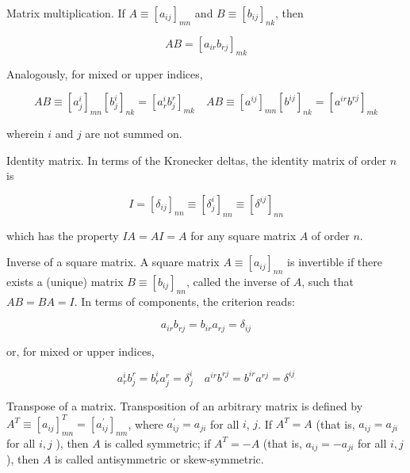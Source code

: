 \documentclass[10pt]{article}
\begin{document}
Matrix multiplication. If $A \equiv\left[a_{i j}\right]_{m n}$ and $B \equiv\left[b_{i j}\right]_{n k}$, then


\begin{equation*}
A B=\left[a_{i r} b_{r j}\right]_{m k} \tag{2.1a}
\end{equation*}


Analogously, for mixed or upper indices,


\begin{equation*}
A B \equiv\left[a_{j}^{i}\right]_{m n}\left[b_{j}^{i}\right]_{n k}=\left[a_{r}^{i} b_{j}^{r}\right]_{m k} \quad A B \equiv\left[a^{i j}\right]_{m n}\left[b^{i j}\right]_{n k}=\left[a^{i r} b^{r j}\right]_{m k} \tag{2.1b}
\end{equation*}


wherein $i$ and $j$ are not summed on.

Identity matrix. In terms of the Kronecker deltas, the identity matrix of order $n$ is

$$
I=\left[\delta_{i j}\right]_{n n} \equiv\left[\delta_{j}^{i}\right]_{n n} \equiv\left[\delta^{i j}\right]_{n n}
$$

which has the property $I A=A I=A$ for any square matrix $A$ of order $n$.

Inverse of a square matrix. A square matrix $A \equiv\left[a_{i j}\right]_{n n}$ is invertible if there exists a (unique) matrix $B \equiv\left[b_{i j}\right]_{n n}$, called the inverse of $A$, such that $A B=B A=I$. In terms of components, the criterion reads:


\begin{equation*}
a_{i r} b_{r j}=b_{i r} a_{r j}=\delta_{i j} \tag{2.2a}
\end{equation*}


or, for mixed or upper indices,


\begin{equation*}
a_{r}^{i} b_{j}^{r}=b_{r}^{i} a_{j}^{r}=\delta_{j}^{i} \quad a^{i r} b^{r j}=b^{i r} a^{r j}=\delta^{i j} \tag{2.2b}
\end{equation*}


Transpose of a matrix. Transposition of an arbitrary matrix is defined by $A^{T} \equiv\left[a_{i j}\right]_{m n}^{T}=\left[a_{i j}^{\prime}\right]_{n m}$, where $a_{i j}^{\prime}=a_{j i}$ for all $i$, $j$. If $A^{T}=A$ (that is, $a_{i j}=a_{j i}$ for all $i, j$ ), then $A$ is called symmetric; if $A^{T}=-A$ (that is, $a_{i j}=-a_{j i}$ for all $i, j$ ), then $A$ is called antisymmetric or skew-symmetric.
\end{document}
